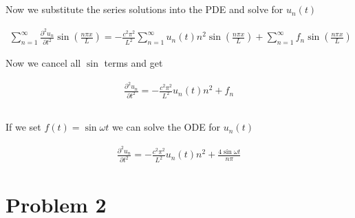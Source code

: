 \documentclass[a4paper]{article}
\begin{document}
\subsection{}

Now we substitute the series solutions into the PDE and solve for $u_n(t)$

\begin{align*}
    \sum_{n=1}^\infty \frac{\partial^2 u_n}{\partial t^2} \sin \left ( \frac{n\pi x}{L} \right ) = -\frac{c^2 \pi^2}{L^2} \sum_{n=1}^{\infty} u_n(t) n^2\sin \left ( \frac{n\pi x}{L} \right ) + \sum_{n=1}^{\infty}f_n \sin \left ( \frac{n\pi x}{L} \right )
\end{align*}

Now we cancel all $\sin$ terms and get

\begin{align*}
    \frac{\partial^2 u_n}{\partial t^2} = -\frac{c^2 \pi^2}{L^2} u_n(t) n^2 + f_n
\end{align*}

\subsection{}

If we set $f(t) = \sin{\omega t}$ we can solve the ODE for $u_n(t)$

\begin{align*}
    \frac{\partial^2 u_n}{\partial t^2} = -\frac{c^2 \pi^2}{L^2} u_n(t) n^2 + \frac{4\sin{\omega t}}{n\pi}
\end{align*}
\subsection{}

\subsection{}

\section{Problem 2}

\subsection{}

\subsection{}
\end{document}
